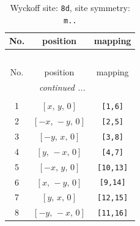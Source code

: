 \documentclass[fleqn,8pt]{jsarticle}
\begin{document}
\renewcommand{\arraystretch}{1.2}
\begin{longtable}{ccc}
\caption{Wyckoff site: {\tt 8d}, site symmetry: {\tt m..}}
 \\
 \hline \hline
No. & position & mapping \\ \hline \endfirsthead

\multicolumn{2}{l}{\tablename\ \thetable{}} \\
 \hline \hline
No. & position & mapping \\ \hline \endhead

 \hline \hline
\multicolumn{2}{r}{\footnotesize\it continued ...} \\ \endfoot

 \hline \hline
\multicolumn{2}{r}{} \\ \endlastfoot

1 & $\left[ x,\, y,\, 0 \right]$ & {\tt [1,6]} \\ \hline
2 & $\left[ - x,\, - y,\, 0 \right]$ & {\tt [2,5]} \\ \hline
3 & $\left[ - y,\, x,\, 0 \right]$ & {\tt [3,8]} \\ \hline
4 & $\left[ y,\, - x,\, 0 \right]$ & {\tt [4,7]} \\ \hline
5 & $\left[ - x,\, y,\, 0 \right]$ & {\tt [10,13]} \\ \hline
6 & $\left[ x,\, - y,\, 0 \right]$ & {\tt [9,14]} \\ \hline
7 & $\left[ y,\, x,\, 0 \right]$ & {\tt [12,15]} \\ \hline
8 & $\left[ - y,\, - x,\, 0 \right]$ & {\tt [11,16]} \\
\end{longtable}
\renewcommand{\arraystretch}{1.2}
\end{document}

